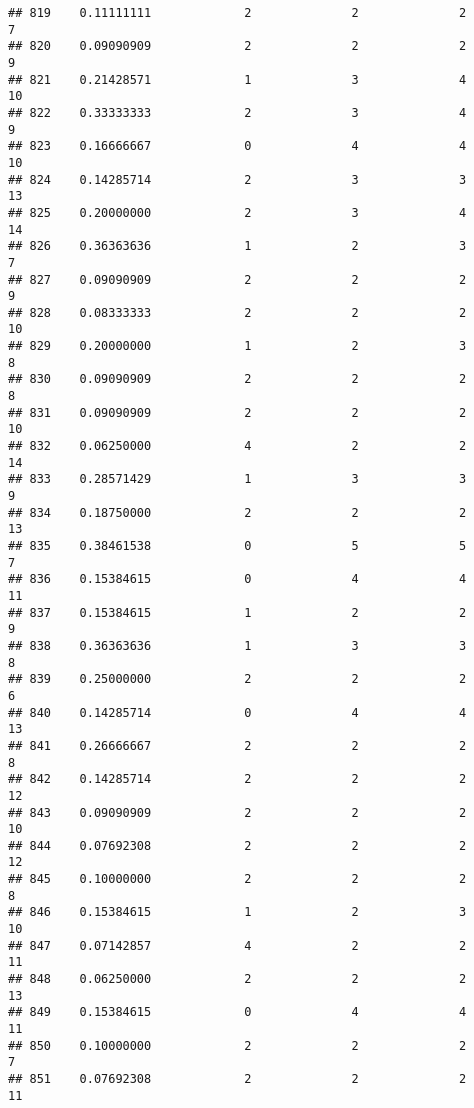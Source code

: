 \documentclass[
]{article}
\begin{document}
\begin{verbatim}
## 819    0.11111111             2              2              2              7
## 820    0.09090909             2              2              2              9
## 821    0.21428571             1              3              4             10
## 822    0.33333333             2              3              4              9
## 823    0.16666667             0              4              4             10
## 824    0.14285714             2              3              3             13
## 825    0.20000000             2              3              4             14
## 826    0.36363636             1              2              3              7
## 827    0.09090909             2              2              2              9
## 828    0.08333333             2              2              2             10
## 829    0.20000000             1              2              3              8
## 830    0.09090909             2              2              2              8
## 831    0.09090909             2              2              2             10
## 832    0.06250000             4              2              2             14
## 833    0.28571429             1              3              3              9
## 834    0.18750000             2              2              2             13
## 835    0.38461538             0              5              5              7
## 836    0.15384615             0              4              4             11
## 837    0.15384615             1              2              2              9
## 838    0.36363636             1              3              3              8
## 839    0.25000000             2              2              2              6
## 840    0.14285714             0              4              4             13
## 841    0.26666667             2              2              2              8
## 842    0.14285714             2              2              2             12
## 843    0.09090909             2              2              2             10
## 844    0.07692308             2              2              2             12
## 845    0.10000000             2              2              2              8
## 846    0.15384615             1              2              3             10
## 847    0.07142857             4              2              2             11
## 848    0.06250000             2              2              2             13
## 849    0.15384615             0              4              4             11
## 850    0.10000000             2              2              2              7
## 851    0.07692308             2              2              2             11

\end{verbatim}
\end{document}
